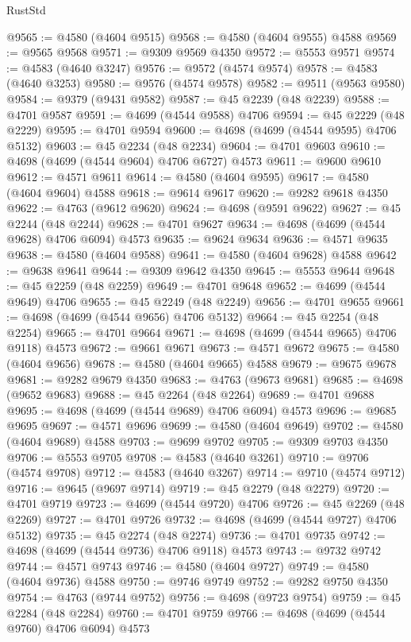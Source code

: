 \begin{lexlean}{RustStd}
\begin{coremodule}
@9565 := @4580 (@4604 @9515)
@9568 := @4580 (@4604 @9555) @4588
@9569 := @9565 @9568
@9571 := @9309 @9569 @4350
@9572 := @5553 @9571
@9574 := @4583 (@4640 @3247)
@9576 := @9572 (@4574 @9574)
@9578 := @4583 (@4640 @3253)
@9580 := @9576 (@4574 @9578)
@9582 := @9511 (@9563 @9580)
@9584 := @9379 (@9431 @9582)
@9587 := @45 @2239 (@48 @2239)
@9588 := @4701 @9587
@9591 := @4699 (@4544 @9588) @4706
@9594 := @45 @2229 (@48 @2229)
@9595 := @4701 @9594
@9600 := @4698 (@4699 (@4544 @9595) @4706 @5132)
@9603 := @45 @2234 (@48 @2234)
@9604 := @4701 @9603
@9610 := @4698 (@4699 (@4544 @9604) @4706 @6727) @4573
@9611 := @9600 @9610
@9612 := @4571 @9611
@9614 := @4580 (@4604 @9595)
@9617 := @4580 (@4604 @9604) @4588
@9618 := @9614 @9617
@9620 := @9282 @9618 @4350
@9622 := @4763 (@9612 @9620)
@9624 := @4698 (@9591 @9622)
@9627 := @45 @2244 (@48 @2244)
@9628 := @4701 @9627
@9634 := @4698 (@4699 (@4544 @9628) @4706 @6094) @4573
@9635 := @9624 @9634
@9636 := @4571 @9635
@9638 := @4580 (@4604 @9588)
@9641 := @4580 (@4604 @9628) @4588
@9642 := @9638 @9641
@9644 := @9309 @9642 @4350
@9645 := @5553 @9644
@9648 := @45 @2259 (@48 @2259)
@9649 := @4701 @9648
@9652 := @4699 (@4544 @9649) @4706
@9655 := @45 @2249 (@48 @2249)
@9656 := @4701 @9655
@9661 := @4698 (@4699 (@4544 @9656) @4706 @5132)
@9664 := @45 @2254 (@48 @2254)
@9665 := @4701 @9664
@9671 := @4698 (@4699 (@4544 @9665) @4706 @9118) @4573
@9672 := @9661 @9671
@9673 := @4571 @9672
@9675 := @4580 (@4604 @9656)
@9678 := @4580 (@4604 @9665) @4588
@9679 := @9675 @9678
@9681 := @9282 @9679 @4350
@9683 := @4763 (@9673 @9681)
@9685 := @4698 (@9652 @9683)
@9688 := @45 @2264 (@48 @2264)
@9689 := @4701 @9688
@9695 := @4698 (@4699 (@4544 @9689) @4706 @6094) @4573
@9696 := @9685 @9695
@9697 := @4571 @9696
@9699 := @4580 (@4604 @9649)
@9702 := @4580 (@4604 @9689) @4588
@9703 := @9699 @9702
@9705 := @9309 @9703 @4350
@9706 := @5553 @9705
@9708 := @4583 (@4640 @3261)
@9710 := @9706 (@4574 @9708)
@9712 := @4583 (@4640 @3267)
@9714 := @9710 (@4574 @9712)
@9716 := @9645 (@9697 @9714)
@9719 := @45 @2279 (@48 @2279)
@9720 := @4701 @9719
@9723 := @4699 (@4544 @9720) @4706
@9726 := @45 @2269 (@48 @2269)
@9727 := @4701 @9726
@9732 := @4698 (@4699 (@4544 @9727) @4706 @5132)
@9735 := @45 @2274 (@48 @2274)
@9736 := @4701 @9735
@9742 := @4698 (@4699 (@4544 @9736) @4706 @9118) @4573
@9743 := @9732 @9742
@9744 := @4571 @9743
@9746 := @4580 (@4604 @9727)
@9749 := @4580 (@4604 @9736) @4588
@9750 := @9746 @9749
@9752 := @9282 @9750 @4350
@9754 := @4763 (@9744 @9752)
@9756 := @4698 (@9723 @9754)
@9759 := @45 @2284 (@48 @2284)
@9760 := @4701 @9759
@9766 := @4698 (@4699 (@4544 @9760) @4706 @6094) @4573

\end{coremodule}
\end{lexlean}

